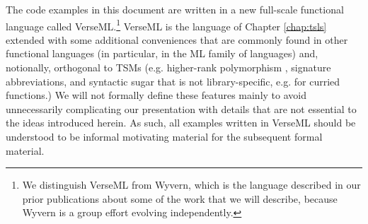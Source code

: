 The code examples in this document are written in a new full-scale functional language called VerseML.\footnote{We distinguish VerseML from Wyvern, which is the language described in our prior publications about some of the work that we will describe, because Wyvern is a group effort evolving independently.} VerseML is the language of Chapter \ref{chap:tsls}  extended with some additional conveniences that are commonly found in other functional languages (in particular, in the ML family of languages) and, notionally, orthogonal to TSMs (e.g. higher-rank polymorphism \cite{conf/icfp/DunfieldK13}, signature abbreviations, and syntactic sugar that is not library-specific, e.g. for curried functions.) %
We will not formally define these features mainly to avoid unnecessarily complicating our presentation with details that are not essential to the ideas introduced herein. As such, all examples written in VerseML should be understood to be informal motivating material for the subsequent formal material. %


